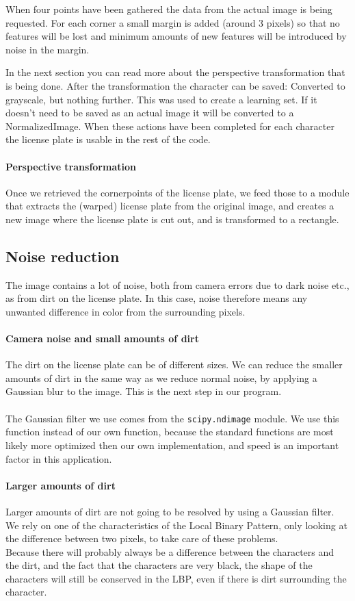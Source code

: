 \documentclass[a4paper]{article}
\begin{document}
When four points have been gathered the data from the actual image is being
requested. For each corner a small margin is added (around 3 pixels) so that no
features will be lost and minimum amounts of new features will be introduced by
noise in the margin. 

In the next section you can read more about the perspective transformation that
is being done. After the transformation the character can be saved: Converted
to grayscale, but nothing further. This was used to create a learning set. If
it doesn't need to be saved as an actual image it will be converted to a
NormalizedImage. When these actions have been completed for each character the
license plate is usable in the rest of the code.

\paragraph*{Perspective transformation}
Once we retrieved the cornerpoints of the license plate, we feed those to a
module that extracts the (warped) license plate from the original image, and
creates a new image where the license plate is cut out, and is transformed to a
rectangle.

\subsection{Noise reduction}

The image contains a lot of noise, both from camera errors due to dark noise 
etc., as from dirt on the license plate. In this case, noise therefore means 
any unwanted difference in color from the surrounding pixels.

\paragraph*{Camera noise and small amounts of dirt}
The dirt on the license plate can be of different sizes. We can reduce the 
smaller amounts of dirt in the same way as we reduce normal noise, by applying
a Gaussian blur to the image. This is the next step in our program.\\
\\
The Gaussian filter we use comes from the \texttt{scipy.ndimage} module. We use
this function instead of our own function, because the standard functions are
most likely more optimized then our own implementation, and speed is an
important factor in this application.

\paragraph*{Larger amounts of dirt}
Larger amounts of dirt are not going to be resolved by using a Gaussian filter.
We rely on one of the characteristics of the Local Binary Pattern, only looking
at the difference between two pixels, to take care of these problems.\\
Because there will probably always be a difference between the characters and
the dirt, and the fact that the characters are very black, the shape of the
characters will still be conserved in the LBP, even if there is dirt
surrounding the character.
\end{document}
